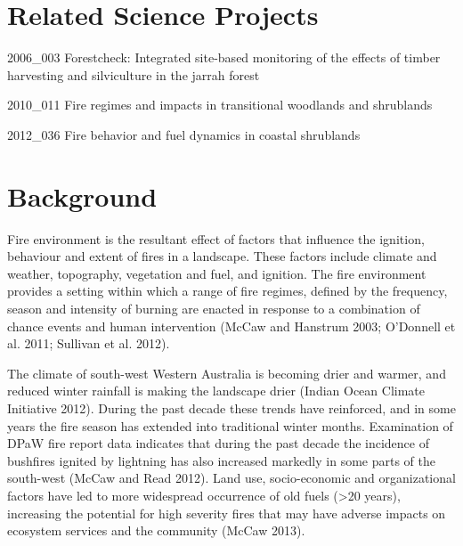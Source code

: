 \documentclass[version=last, paper=a4, DIV=18, usenames, dvipsnames]{scrartcl}
\begin{document}
\section{Related Science Projects}



2006_003 Forestcheck: Integrated site-based monitoring of the effects of timber harvesting and silviculture in the jarrah forest


2010_011 Fire regimes and impacts in transitional woodlands and shrublands


2012_036 Fire behavior and fuel dynamics in coastal shrublands






\section{Background}



Fire environment is the resultant effect of factors that influence the ignition, behaviour and extent of fires in a landscape. These factors include climate and weather, topography, vegetation and fuel, and ignition. The fire environment provides a setting within which a range of fire regimes, defined by the frequency, season and intensity of burning are enacted in response to a combination of chance events and human intervention (McCaw and Hanstrum 2003; O'Donnell et al. 2011; Sullivan et al. 2012).


The climate of south-west Western Australia is becoming drier and warmer, and reduced winter rainfall is making the landscape drier (Indian Ocean Climate Initiative 2012). During the past decade these trends have reinforced, and in some years the fire season has extended into traditional winter months. Examination of DPaW fire report data indicates that during the past decade the incidence of bushfires ignited by lightning has also increased markedly in some parts of the south-west (McCaw and Read 2012). Land use, socio-economic and organizational factors have led to more widespread occurrence of old fuels (>20 years), increasing the potential for high severity fires that may have adverse impacts on ecosystem services and the community (McCaw 2013).
\end{document}

